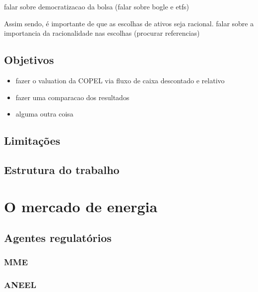 \documentclass[grad,numbers]{coppe}
\providecommand{\tightlist}{%
  \setlength{\itemsep}{0pt}\setlength{\parskip}{0pt}}
\begin{document}
  falar sobre democratizacao da bolsa (falar sobre bogle e etfs)
  
  Assim sendo, é importante de que as escolhas de ativos seja racional.
  falar sobre a importancia da racionalidade nas escolhas (procurar referencias)
  
  \hypertarget{objetivos}{%
  \section{Objetivos}\label{objetivos}}
  \begin{itemize}
  \tightlist
  \item
    fazer o valuation da COPEL via fluxo de caixa descontado e relativo
  \item
    fazer uma comparacao dos resultados
  \item
    alguma outra coisa
  \end{itemize}
  \hypertarget{limitauxe7uxf5es}{%
  \section{Limitações}\label{limitauxe7uxf5es}}
  
  \hypertarget{estrutura-do-trabalho}{%
  \section{Estrutura do trabalho}\label{estrutura-do-trabalho}}
  
  \hypertarget{o-mercado-de-energia}{%
  \chapter{O mercado de energia}\label{o-mercado-de-energia}}
  
  \hypertarget{agentes-regulatuxf3rios}{%
  \section{Agentes regulatórios}\label{agentes-regulatuxf3rios}}
  
  \hypertarget{mme}{%
  \subsection{MME}\label{mme}}
  
  \hypertarget{aneel}{%
  \subsection{ANEEL}\label{aneel}}
  
\end{document}
